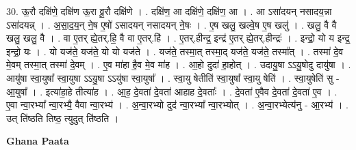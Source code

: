 \documentclass[17pt]{extarticle}
\begin{document}
30. ऊ॒रौ दक्षि॑णे॒ दक्षि॑ण ऊ॒रा वू॒रौ दक्षि॑णे । . दक्षि॑ण॒ आ दक्षि॑णे॒ दक्षि॑ण॒ आ । . आ ऽसा॑दयन् नसादय॒न्ना ऽसा॑दयन्न् । . अ॒सा॒द॒य॒न् ने॒ष ए॒षो॑ ऽसादयन् नसादयन् ने॒षः । . ए॒ष खलु॒ खल्वे॒ष ए॒ष खलु॑ । . खलु॒ वै वै खलु॒ खलु॒ वै । . वा ए॒तर् ह्ये॒तर्.हि॒ वै वा ए॒तर्.हि॑ । . ए॒तर्.हीन्द्र॒ इन्द्र॑ ए॒तर् ह्ये॒तर्.हीन्द्रः॑ । . इन्द्रो॒ यो य इन्द्र॒ इन्द्रो॒ यः । . यो यज॑ते॒ यज॑ते॒ यो यो यज॑ते । . यज॑ते॒ तस्मा॒त् तस्मा॒द् यज॑ते॒ यज॑ते॒ तस्मा᳚त् । . तस्मा॑ दे॒व मे॒वम् तस्मा॒त् तस्मा॑ दे॒वम् । . ए॒व मा॑हा है॒व मे॒व मा॑ह । . आ॒हो दुदा॑ हा॒होत् । . उदायु॒षा ऽऽयु॒षोदु दायु॑षा । . आयु॑षा स्वा॒युषा᳚ स्वा॒युषा ऽऽयु॒षा ऽऽयु॑षा स्वा॒युषा᳚ । . स्वा॒यु षेतीति॑ स्वा॒युषा᳚ स्वा॒यु षेति॑ । . स्वा॒युषेति॑ सु - आ॒युषा᳚ । . इत्या॑हा॒हे तीत्या॑ह । . आ॒ह॒ दे॒वता॑ दे॒वता॑ आहाह दे॒वताः᳚ । . दे॒वता॑ ए॒वैव दे॒वता॑ दे॒वता॑ ए॒व । . ए॒वा न्वा॒रभ्या᳚ न्वा॒रभ्यै॒ वैवा न्वा॒रभ्य॑ । . अ॒न्वा॒रभ्यो दुद॑ न्वा॒रभ्या᳚ न्वा॒रभ्योत् । . अ॒न्वा॒रभ्येत्य॑नु - आ॒रभ्य॑ । . उत् ति॑ष्ठति तिष्ठ॒ त्युदुत् ति॑ष्ठति । \newline

\textbf{Ghana Paata } \newline
\end{document}
